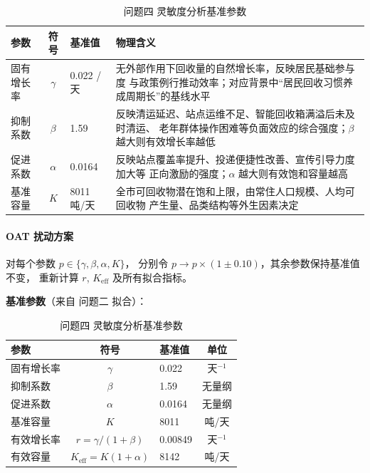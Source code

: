 \documentclass[12pt,a4paper]{ctexart}
\begin{document}
\begin{table}[htbp]
\begin{table}[htbp]
\centering
\caption{参数物理含义（结合``沪尚回收''实际场景）}
\label{tab:param_meaning}
\begin{tabular}{lclp{7cm}}
\toprule
参数 & 符号 & 基准值 & 物理含义 \\
\midrule
固有增长率 & $\gamma$ & 0.022 /天 &
  无外部作用下回收量的自然增长率，反映居民基础参与度
  与政策例行推动效率；对应背景中``居民回收习惯养成周期长''的基线水平 \\

抑制系数 & $\beta$ & 1.59 &
  反映清运延迟、站点运维不足、智能回收箱满溢后未及时清运、
  老年群体操作困难等负面效应的综合强度；$\beta$ 越大则有效增长率越低 \\

促进系数 & $\alpha$ & 0.0164 &
  反映站点覆盖率提升、投递便捷性改善、宣传引导力度加大等
  正向激励的强度；$\alpha$ 越大则有效饱和容量越高 \\

基准容量 & $K$ & 8011 吨/天 &
  全市可回收物潜在饱和上限，由常住人口规模、人均可回收物
  产生量、品类结构等外生因素决定 \\
\bottomrule
\end{tabular}
\end{table}

\paragraph{OAT 扰动方案}

对每个参数 $p \in \{\gamma, \beta, \alpha, K\}$，
分别令 $p \to p \times (1 \pm 0.10)$，其余参数保持基准值不变，
重新计算 $r$, $K_{\text{eff}}$ 及所有拟合指标。

\textbf{基准参数}（来自 问题二 拟合）：

\begin{table}[htbp]
\centering
\caption{问题四 灵敏度分析基准参数}
\label{tab:baseline_params}
\begin{tabular}{lclc}
\toprule
参数 & 符号 & 基准值 & 单位 \\
\midrule
固有增长率 & $\gamma$ & 0.022   & 天$^{-1}$ \\
抑制系数   & $\beta$  & 1.59  & 无量纲 \\
促进系数   & $\alpha$ & 0.0164  & 无量纲 \\
基准容量   & $K$      & 8011    & 吨/天 \\
\midrule
有效增长率 & $r = \gamma/(1+\beta)$ & 0.00849 & 天$^{-1}$ \\
有效容量   & $K_{\text{eff}} = K(1+\alpha)$ & 8142 & 吨/天 \\
\bottomrule
\end{tabular}
\end{table}


\end{table}
\end{document}

